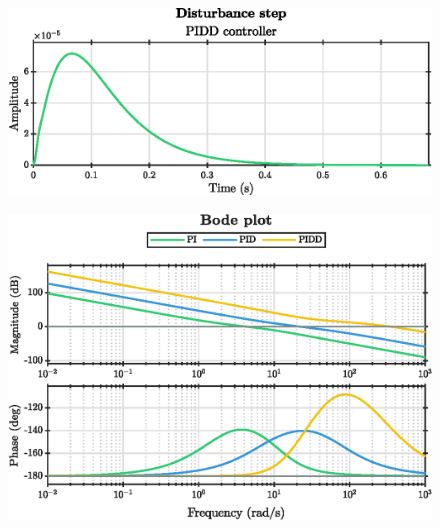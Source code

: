 \begin{figure}[ht]
    \centering
    \includegraphics[]{media/q2/pidd_response.eps}
    \caption{}
    \label{fig:q2_pidd_response}
\end{figure}
\begin{figure}[ht]
    \centering
    \includegraphics[]{media/q2/pi_bode_comparison.eps}
    \caption{}
    \label{fig:q2_bode_comparison}
\end{figure}
